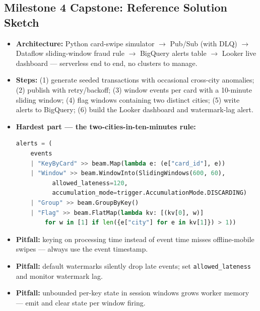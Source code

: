\documentclass[11pt, a4paper]{article}
\begin{document}
\subsection*{Milestone 4 Capstone: Reference Solution Sketch}
\begin{itemize}[label=-, leftmargin=1.5em]
    \item \textbf{Architecture:} Python card-swipe simulator $\rightarrow$ Pub/Sub (with DLQ) $\rightarrow$ Dataflow sliding-window fraud rule $\rightarrow$ BigQuery alerts table $\rightarrow$ Looker live dashboard --- serverless end to end, no clusters to manage.
    \item \textbf{Steps:} (1) generate seeded transactions with occasional cross-city anomalies; (2) publish with retry/backoff; (3) window events per card with a 10-minute sliding window; (4) flag windows containing two distinct cities; (5) write alerts to BigQuery; (6) build the Looker dashboard and watermark-lag alert.
    \item \textbf{Hardest part --- the two-cities-in-ten-minutes rule:}
\begin{lstlisting}[language=Python]
alerts = (
    events
    | "KeyByCard" >> beam.Map(lambda e: (e["card_id"], e))
    | "Window" >> beam.WindowInto(SlidingWindows(600, 60),
          allowed_lateness=120,
          accumulation_mode=trigger.AccumulationMode.DISCARDING)
    | "Group" >> beam.GroupByKey()
    | "Flag" >> beam.FlatMap(lambda kv: [(kv[0], w)]
        for w in [1] if len({e["city"] for e in kv[1]}) > 1))
\end{lstlisting}
    \item \textbf{Pitfall:} keying on processing time instead of event time misses offline-mobile swipes --- always use the event timestamp.
    \item \textbf{Pitfall:} default watermarks silently drop late events; set \texttt{allowed\_lateness} and monitor watermark lag.
    \item \textbf{Pitfall:} unbounded per-key state in session windows grows worker memory --- emit and clear state per window firing.
\end{itemize}
\end{document}
